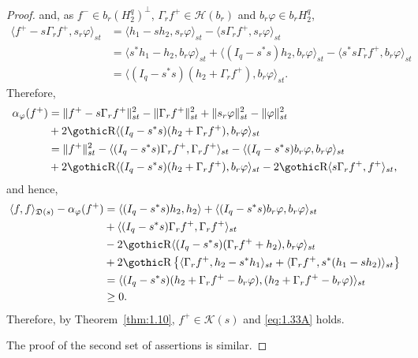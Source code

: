 \documentclass[12pt,twoside,a4paper]{amsart}
\theoremstyle{definition}
\numberwithin{equation}{section}
\begin{document}
\begin{proof}
and, as $f^-\in b_r(H_2^q)^{\bot}$, $\Gamma_r f^+\in{{\mathcal H}}(b_r)$
and $b_r \varphi\in b_r H_2^q$,
\begin{equation}\label{eq:1.40A}
\begin{split}
\langle f^+ -s\Gamma_r f^+ , s_r \varphi\rangle_{st}
&=\langle h_1 -sh_2 , s_r \varphi\rangle_{st}-\langle s\Gamma_r f^+ ,
s_r \varphi\rangle_{st}\\
&=\langle s^*h_1 -h_2 , b_r \varphi\rangle_{st}+\langle(I_q -s^*s)h_2 ,
b_r \varphi\rangle_{st}-\langle s^*s\Gamma_r f^+ , b_r \varphi\rangle_{st}\\
&=\langle(I_q -s^*s)(h_2 +\Gamma_r f^+), b_r \varphi\rangle_{st}.
\end{split}
\end{equation}
Therefore,
\begin{equation}\label{eq:1.41A}
\begin{split}
\alpha_\varphi(f^+) &=\|f^+ -s\Gamma_r f^+\|_{st}^2-\|\Gamma_r f^+\|_{st}^2
+\| s_r\varphi\|_{st}^2
-\|\varphi\|_{st}^2\\
&+2{\mbox{\gothic\char'122}}\langle(I_q -s^*s)(h_2 +\Gamma_r f^+), b_r \varphi\rangle_{st}\\
&=\|f^+\|_{st}^2-\langle(I_q -s^*s)\Gamma_r f^+, \Gamma_r
f^+\rangle_{st}-
\langle(I_q -s^*s)b_r \varphi, b_r \varphi\rangle_{st}\\
&+2{\mbox{\gothic\char'122}}\langle(I_q -s^*s)(h_2 +\Gamma_r f^+),b_r
\varphi\rangle_{st}-2{\mbox{\gothic\char'122}}\langle s\Gamma_r f^+ , f^+\rangle_{st},
\end{split}
\end{equation}
and hence,
\begin{equation}\label{eq:1.42A}
\begin{split}
\langle f,f\rangle_{{{\mathfrak D}}(s)}-\alpha_\varphi(f^+)
&=\langle(I_q -s^*s)h_2 , h_2\rangle+\langle(I_q -s^*s)b_r \varphi, b_r
\varphi\rangle_{st}\\
&+\langle(I_q -s^*s)\Gamma_r f^+ , \Gamma_r f^+\rangle_{st}\\
&-2{\mbox{\gothic\char'122}}\langle(I_q -s^*s)(\Gamma_r f^+ +h_2), b_r \varphi\rangle_{st}\\
&+2{\mbox{\gothic\char'122}}\left\{\langle\Gamma_r f^+ , h_2-s^*h_1 \rangle_{st}
+\langle\Gamma_r f^+ , s^*(h_1-sh_2) \rangle_{st}\right\}\\
&=\langle(I_q -s^*s)(h_2+\Gamma_r f^+ -b_r\varphi),
(h_2+\Gamma_r f^+ -b_r\varphi)\rangle_{st}\\
&\ge 0.
\end{split}
\end{equation}
Therefore, by Theorem~\ref{thm:1.10}, $f^+\in{{\mathcal K}}(s)$ and
\eqref{eq:1.33A} holds.

The proof of the second set of assertions is similar.
\end{proof}
\end{document}
